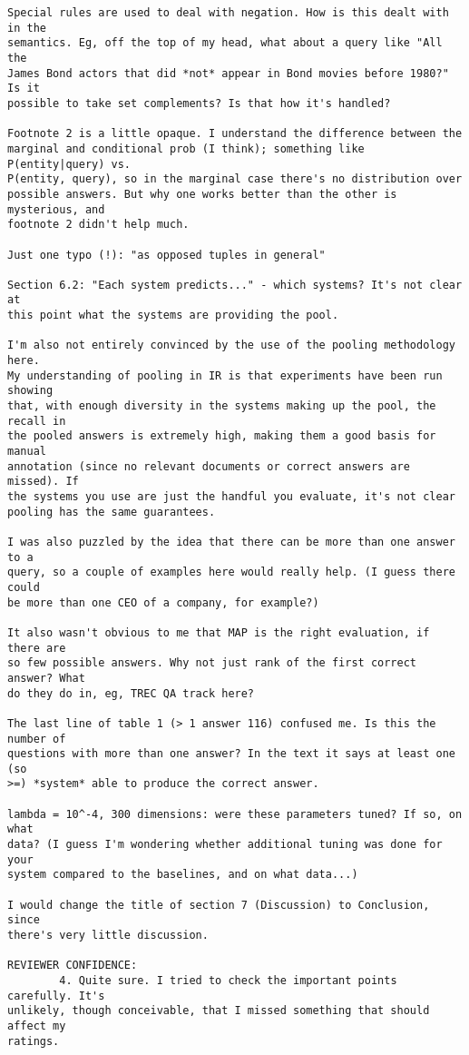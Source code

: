 \documentclass{article}[11pt,oneside]
\begin{document}
\begin{verbatim}
Special rules are used to deal with negation. How is this dealt with in the
semantics. Eg, off the top of my head, what about a query like "All the
James Bond actors that did *not* appear in Bond movies before 1980?" Is it
possible to take set complements? Is that how it's handled?

Footnote 2 is a little opaque. I understand the difference between the
marginal and conditional prob (I think); something like P(entity|query) vs.
P(entity, query), so in the marginal case there's no distribution over
possible answers. But why one works better than the other is mysterious, and
footnote 2 didn't help much.

Just one typo (!): "as opposed tuples in general"

Section 6.2: "Each system predicts..." - which systems? It's not clear at
this point what the systems are providing the pool.

I'm also not entirely convinced by the use of the pooling methodology here.
My understanding of pooling in IR is that experiments have been run showing
that, with enough diversity in the systems making up the pool, the recall in
the pooled answers is extremely high, making them a good basis for manual
annotation (since no relevant documents or correct answers are missed). If
the systems you use are just the handful you evaluate, it's not clear
pooling has the same guarantees.

I was also puzzled by the idea that there can be more than one answer to a
query, so a couple of examples here would really help. (I guess there could
be more than one CEO of a company, for example?)

It also wasn't obvious to me that MAP is the right evaluation, if there are
so few possible answers. Why not just rank of the first correct answer? What
do they do in, eg, TREC QA track here?

The last line of table 1 (> 1 answer 116) confused me. Is this the number of
questions with more than one answer? In the text it says at least one (so
>=) *system* able to produce the correct answer.

lambda = 10^-4, 300 dimensions: were these parameters tuned? If so, on what
data? (I guess I'm wondering whether additional tuning was done for your
system compared to the baselines, and on what data...)

I would change the title of section 7 (Discussion) to Conclusion, since
there's very little discussion.

REVIEWER CONFIDENCE:
        4. Quite sure. I tried to check the important points carefully. It's
unlikely, though conceivable, that I missed something that should affect my
ratings.

\end{verbatim}
\end{document}
